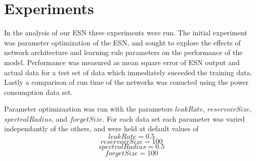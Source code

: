 \documentclass{acm_proc_article-sp}
\begin{document}
\section{Experiments}
In the analysis of our ESN three experiments were run. The initial experiment was parameter optimization of the ESN, and sought to explore the effects of network architecture and learning rule parameters on the performance of the model. Performance was measured as mean square error of ESN output and actual data for a test set of data which immediately suceeded the training data. Lastly a comparison of run time of the networks was conucted using the power consumption data set.

Parameter optimizaation was run with the parameters $leakRate$, $reservoirSize$, $spectralRadius$, and $forgetSize$. For each data set each parameter was varied independantly of the others, and were held at default values of
$$leakRate = 0.5$$
$$reservoirSize = 100$$
$$spectralRadius = 0.5$$
$$forgetSize = 100$$
\end{document}
